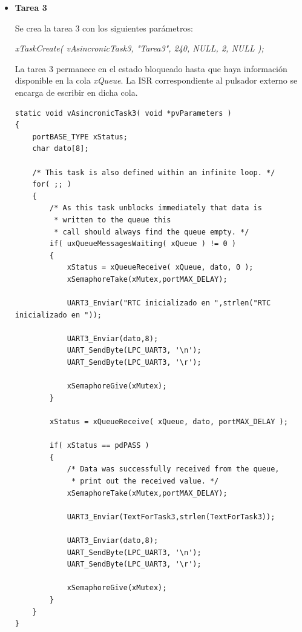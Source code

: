 \documentclass[a4paper,12pt]{article}
\begin{document}
\begin{itemize}
\begin{verbatim}
	/* Inicializacion del puntero al buffer de recepcion */
	buffer = &RxBuffer;

	/* As per most tasks, this task is implemented 
	 * within an infinite loop. */
	for( ;; )
	{
	
	xSemaphoreTake( xCountingSemaphore, portMAX_DELAY );
	xSemaphoreTake(xMutex,portMAX_DELAY);

	/* Envia por la UART3 el mensaje constante. */
	UART3_Enviar(TextForTask2,strlen(TextForTask2));

	UART3_Enviar(buffer,1);
	UART_SendByte(LPC_UART3, '\n'); UART_SendByte(LPC_UART3, '\r');

	xSemaphoreGive(xMutex);
	}
}

\end{verbatim}

\item{\textbf{Tarea 3}}

Se crea la tarea 3 con los siguientes parámetros:

\begin{center}
\textit{xTaskCreate( vAsincronicTask3, "Tarea3", 240, NULL, 2, NULL );}
\end{center}

La tarea 3 permanece en el estado bloqueado hasta que haya información disponible en la cola {\textit{xQueue}}.  La ISR correspondiente al pulsador externo se encarga de escribir en dicha cola.

\begin{verbatim}
static void vAsincronicTask3( void *pvParameters )
{
	portBASE_TYPE xStatus;
	char dato[8];

	/* This task is also defined within an infinite loop. */
	for( ;; )
	{
		/* As this task unblocks immediately that data is
		 * written to the queue this
		 * call should always find the queue empty. */
		if( uxQueueMessagesWaiting( xQueue ) != 0 )
		{
			xStatus = xQueueReceive( xQueue, dato, 0 );
			xSemaphoreTake(xMutex,portMAX_DELAY);

			UART3_Enviar("RTC inicializado en ",strlen("RTC inicializado en "));

			UART3_Enviar(dato,8);
			UART_SendByte(LPC_UART3, '\n');
			UART_SendByte(LPC_UART3, '\r');

			xSemaphoreGive(xMutex);
		}

		xStatus = xQueueReceive( xQueue, dato, portMAX_DELAY );

		if( xStatus == pdPASS )
		{
			/* Data was successfully received from the queue, 
			 * print out the received value. */
			xSemaphoreTake(xMutex,portMAX_DELAY);

			UART3_Enviar(TextForTask3,strlen(TextForTask3));

			UART3_Enviar(dato,8);
			UART_SendByte(LPC_UART3, '\n');
			UART_SendByte(LPC_UART3, '\r');

			xSemaphoreGive(xMutex);
		}
	}
}
\end{verbatim}
\end{itemize}
\end{document}
